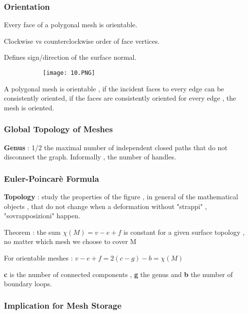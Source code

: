 \documentclass{article}
\begin{document}
\subsubsection{Orientation}

Every face of a polygonal mesh is orientable. 

Clockwise vs counterclockwise order of face vertices.

Defines sign/direction of the surface normal.

\begin{figure}[ht!]
  \centering
  \begin{subfigure}[b]{0.3\linewidth}
    \texttt{[image: 10.PNG]}
  \end{subfigure}
\end{figure}

A polygonal mesh is orientable , if the incident faces to every edge can be consistently oriented, if the faces are consistently oriented for every edge , the mesh is oriented.


\subsubsection{Global Topology of Meshes}

\textbf{Genus} : 1/2 the maximal number of independent closed paths that do not disconnect the graph. Informally , the number of handles.


\subsubsection{Euler-Poincarè Formula}

\textbf{Topology} : study the properties of the figure , in general of the mathematical objects , that do not change when a deformation without "strappi" , "sovrapposizioni" happen.

Theorem : the sum $\chi(M) = v - e + f$ is constant for a given surface topology , no matter which mesh we choose to cover M

For orientable meshes : $v - e + f = 2(c-g) - b = \chi(M)$

\textbf{c} is the number of connected components , \textbf{g} the genus and \textbf{b} the number of boundary loops.

\subsubsection{Implication for Mesh Storage}
\end{document}
